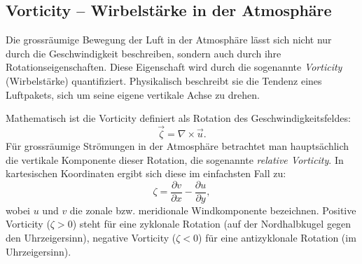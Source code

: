 
\subsection{Vorticity – Wirbelstärke in der Atmosphäre}

Die grossräumige Bewegung der Luft in der Atmosphäre lässt sich nicht nur durch die
Geschwindigkeit beschreiben, sondern auch durch ihre Rotationseigenschaften.
Diese Eigenschaft wird durch die sogenannte \emph{Vorticity} (Wirbelstärke)
%
%
quantifiziert. Physikalisch beschreibt sie die Tendenz eines Luftpakets, sich
um seine eigene vertikale Achse zu drehen.

Mathematisch ist die Vorticity definiert als Rotation des
Geschwindigkeitsfeldes:
\begin{equation}
	\vec{\zeta} = \nabla \times \vec{u}.
	\label{rossby:eq:vorticity}
\end{equation}
Für grossräumige Strömungen in der Atmosphäre betrachtet man hauptsächlich die vertikale Komponente dieser Rotation, die sogenannte \emph{relative Vorticity}.
%
%
In kartesischen Koordinaten ergibt sich diese im einfachsten Fall zu:
\begin{equation}
	\zeta = \frac{\partial v}{\partial x} - \frac{\partial u}{\partial y},
	\label{rossby:eq:relative_vorticity}
\end{equation}
wobei \(u\) und \(v\) die zonale bzw. meridionale Windkomponente bezeichnen.
Positive Vorticity (\(\zeta > 0\)) steht für eine zyklonale Rotation (auf der Nordhalbkugel gegen den Uhrzeigersinn), negative Vorticity (\(\zeta < 0\)) für eine antizyklonale Rotation (im Uhrzeigersinn).
%
%
